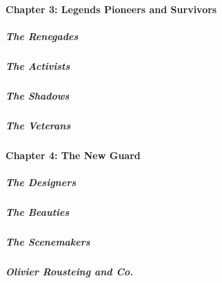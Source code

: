 \hypertarget{chapter-3-legends-pioneers-and-survivors}{%
\paragraph{Chapter 3: Legends Pioneers and
Survivors}\label{chapter-3-legends-pioneers-and-survivors}}

\href{/interactive/2020/04/13/t-magazine/butch-stud-lesbian.html}{}

\hypertarget{the-renegades}{%
\subparagraph{The Renegades}\label{the-renegades}}

\href{/interactive/2020/04/13/t-magazine/act-up-aids.html}{}

\hypertarget{the-activists}{%
\subparagraph{The Activists}\label{the-activists}}

\href{/interactive/2020/04/13/t-magazine/artist-recluse.html}{}

\hypertarget{the-shadows}{%
\subparagraph{The Shadows}\label{the-shadows}}

\href{/interactive/2020/04/13/t-magazine/black-actresses-bassett-berry-blige-henson-whitfield-elise.html}{}

\hypertarget{the-veterans}{%
\subparagraph{The Veterans}\label{the-veterans}}

\hypertarget{chapter-4-the-new-guard-1}{%
\paragraph{Chapter 4: The New Guard}\label{chapter-4-the-new-guard-1}}

\href{/interactive/2020/04/13/t-magazine/asian-american-fashion-designers.html}{}

\hypertarget{the-designers}{%
\subparagraph{The Designers}\label{the-designers}}

\href{13tmag-beauties.html}{}

\hypertarget{the-beauties}{%
\subparagraph{The Beauties}\label{the-beauties}}

\href{/interactive/2020/04/13/t-magazine/nyc-downtown-nightlife-party-scene.html}{}

\hypertarget{the-scenemakers}{%
\subparagraph{The Scenemakers}\label{the-scenemakers}}

\href{/interactive/2020/04/13/t-magazine/maria-cornejo-olivier-rousteing-telfar-clemens-alessandro-michele.html\#olivier-rousteing-and-co}{}

\hypertarget{olivier-rousteing-and-co}{%
\subparagraph{Olivier Rousteing and
Co.}\label{olivier-rousteing-and-co}}

